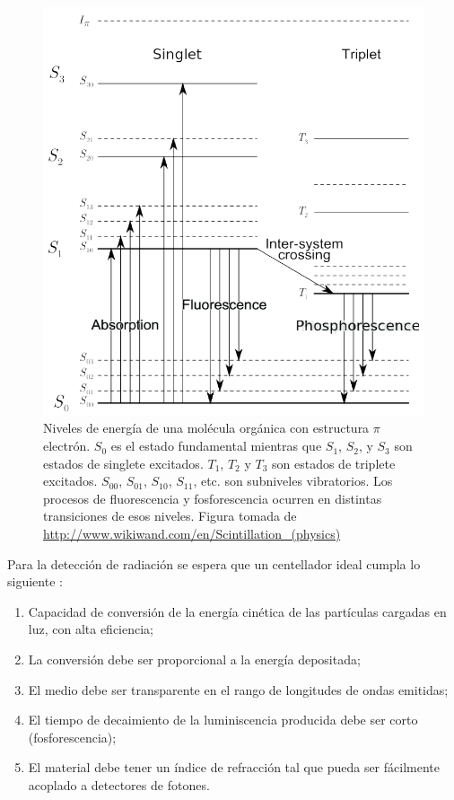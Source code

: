 \documentclass[12pt,oneside,openany,letter]{book}
\begin{document}
\begin{figure}
\begin{center}
\includegraphics[scale=0.5]{images/scintillation_process.png}
\caption[Niveles de energía de una molécula orgánica con estructura $\pi$ electrón.]{Niveles de energía de una molécula orgánica con estructura $\pi$ electrón. $S_0$ es el estado fundamental mientras que $S_1$, $S_2$, y $S_3$ son estados de singlete excitados. $T_1$, $T_2$ y $T_3$ son estados de triplete excitados. $S_{00}$, $S_{01}$, $S_{10}$, $S_{11}$, etc. son subniveles vibratorios. Los procesos de fluorescencia y fosforescencia ocurren en distintas transiciones de esos niveles. Figura tomada de \url{ http://www.wikiwand.com/en/Scintillation_(physics)}}
\label{scintillation_process}
\end{center}
\end{figure}

Para la detección de radiación se espera que un centellador ideal cumpla lo siguiente \cite{Gonzalez-maestrando2012}:
\begin{enumerate}
\item Capacidad de conversión de la energía cinética de las partículas cargadas en luz, con alta eficiencia;
\item La conversión debe ser proporcional a la energía depositada;
\item El medio debe ser transparente en el rango de longitudes de ondas emitidas;
\item El tiempo de decaimiento de la luminiscencia producida debe ser corto (fosforescencia);
\item El material debe tener un índice de refracción tal que pueda ser fácilmente acoplado a detectores de fotones.
\end{enumerate}
\end{document}
